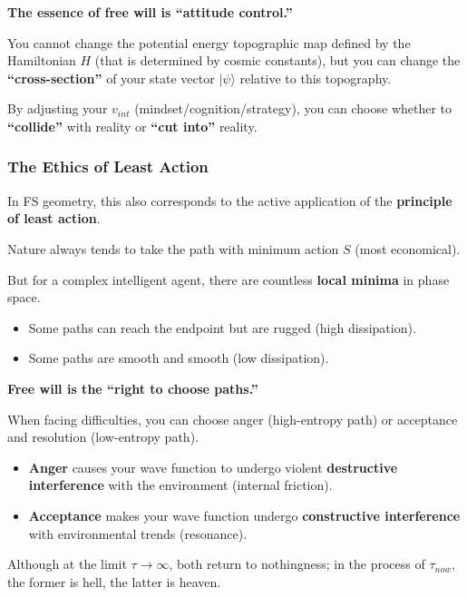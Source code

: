 \textbf{The essence of free will is ``attitude control.''}

You cannot change the potential energy topographic map defined by the Hamiltonian $H$ (that is determined by cosmic constants), but you can change the \textbf{``cross-section''} of your state vector $|\psi\rangle$ relative to this topography.

By adjusting your $v_{int}$ (mindset/cognition/strategy), you can choose whether to \textbf{``collide''} with reality or \textbf{``cut into''} reality.

\subsubsection{The Ethics of Least Action}

In FS geometry, this also corresponds to the active application of the \textbf{principle of least action}.

Nature always tends to take the path with minimum action $S$ (most economical).

But for a complex intelligent agent, there are countless \textbf{local minima} in phase space.

\begin{itemize}
\item Some paths can reach the endpoint but are rugged (high dissipation).

\item Some paths are smooth and smooth (low dissipation).
\end{itemize}

\textbf{Free will is the ``right to choose paths.''}

When facing difficulties, you can choose anger (high-entropy path) or acceptance and resolution (low-entropy path).

\begin{itemize}
\item \textbf{Anger} causes your wave function to undergo violent \textbf{destructive interference} with the environment (internal friction).

\item \textbf{Acceptance} makes your wave function undergo \textbf{constructive interference} with environmental trends (resonance).
\end{itemize}

Although at the limit $\tau \to \infty$, both return to nothingness; in the process of $\tau_{now}$, the former is hell, the latter is heaven.

